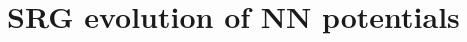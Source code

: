\documentclass[preprintnumbers,floatfix,aps,prc,preprint,nofootinbib]{revtex4-1}
\begin{document}
\noindent{%
\textcolor{red}{Overview of sections.}
}


\section{SRG evolution of NN potentials}
\label{sec:srg_evolution_nn_potentials}


%
	
\end{document}
